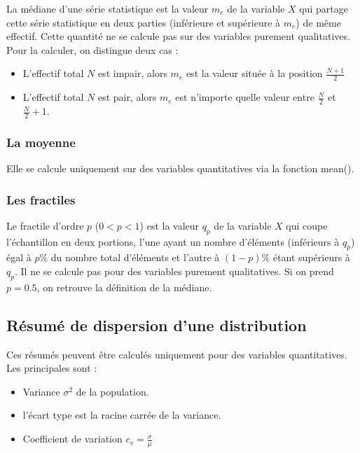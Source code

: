 \documentclass[]{book}
\providecommand{\tightlist}{%
  \setlength{\itemsep}{0pt}\setlength{\parskip}{0pt}}
\theoremstyle{definition}
\theoremstyle{definition}
\theoremstyle{remark}
\begin{document}
La médiane d'une série statistique est la valeur \(m_e\) de la variable
\(X\) qui partage cette série statistique en deux parties (inférieure et
supérieure à \(m_e\)) de même effectif. Cette quantité ne se calcule pas
sur des variables purement qualitatives. Pour la calculer, on distingue
deux cas :

\begin{itemize}
\item
  L'effectif total \(N\) est impair, alors \(m_e\) est la valeur située
  à la position \(\frac{N+1}{2}\)
\item
  L'effectif total \(N\) est pair, alors \(m_e\) est n'importe quelle
  valeur entre \(\frac N2\) et \(\frac N2 +1\).
\end{itemize}

\subsubsection{La moyenne}\label{la-moyenne}

Elle se calcule uniquement sur des variables quantitatives via la
fonction mean().

\subsubsection{Les fractiles}\label{les-fractiles}

Le fractile d'ordre \(p\) (\(0<p<1\)) est la valeur \(q_p\) de la
variable \(X\) qui coupe l'échantillon en deux portions, l'une ayant un
nombre d'éléments (inférieurs à \(q_p\)) égal à \(p\%\) du nombre total
d'éléments et l'autre à \((1-p)\%\) étant supérieurs à \(q_p\). Il ne se
calcule pas pour des variables purement qualitatives. Si on prend
\(p=0.5\), on retrouve la définition de la médiane.

\subsection{Résumé de dispersion d'une
distribution}\label{resume-de-dispersion-dune-distribution}

Ces résumés peuvent être calculés uniquement pour des variables
quantitatives. Les principales sont :

\begin{itemize}
\tightlist
\item
  Variance \(\sigma^2\) de la population.
\item
  l'écart type est la racine carrée de la variance.
\item
  Coefficient de variation \(c_v=\frac{\sigma}{\mu}\)
\end{itemize}
\end{document}
